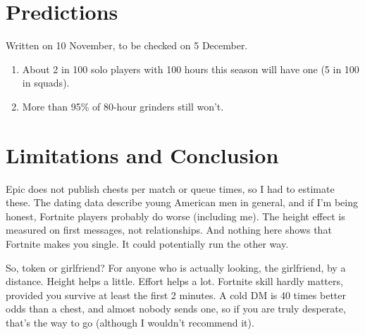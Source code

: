 \documentclass[11pt]{article}
\theoremstyle{definition}
\theoremstyle{plain}
\begin{document}
\section{Predictions}

Written on 10 November, to be checked on 5 December.
\begin{enumerate}[noitemsep,topsep=2pt]
\item About 2 in 100 solo players with 100 hours this season will have one (5 in 100 in squads).
\item More than 95\% of 80-hour grinders still won't.
\end{enumerate}

\section{Limitations and Conclusion}

Epic does not publish chests per match or queue times, so I had to estimate these. The dating data describe young American men in general, and if I'm being honest, Fortnite players probably do worse (including me). The height effect is measured on first messages, not relationships. And nothing here shows that Fortnite makes you single. It could potentially run the other way.

So, token or girlfriend? For anyone who is actually looking, the girlfriend, by a distance. Height helps a little. Effort helps a lot. Fortnite skill hardly matters, provided you survive at least the first 2 minutes. A cold DM is 40 times better odds than a chest, and almost nobody sends one, so if you are truly desperate, that's the way to go (although I wouldn't recommend it).
\end{document}
